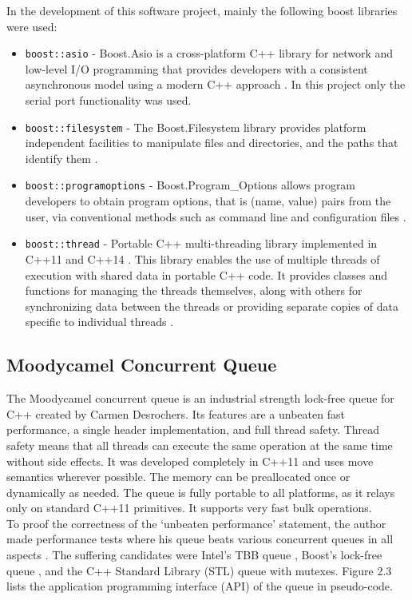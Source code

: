 In the development of this software project, mainly the following boost libraries were used:
\begin{itemize}
\item \texttt{boost::asio} - Boost.Asio is a cross-platform C++ library for network and low-level I/O programming that provides developers with a consistent asynchronous model using a modern C++ approach \cite{boost_asio}. In this project only the serial port functionality was used.
\item \texttt{boost::filesystem} - The Boost.Filesystem library provides platform independent facilities to manipulate files and directories, and the paths that identify them \cite{boost_files}.
\item \texttt{boost::programoptions} - Boost.Program\_Options allows program developers to obtain program options, that is (name, value) pairs from the user, via conventional methods such as command line and configuration files \cite{boost_po}. 
\item \texttt{boost::thread} - Portable C++ multi-threading library implemented in C++11 \cite{cpp_11} and C++14 \cite{cpp_14}. This library enables the use of multiple threads of execution with shared data in portable C++ code. It provides classes and functions for managing the threads themselves, along with others for synchronizing data between the threads or providing separate copies of data specific to individual threads \cite{boost_thread}. 
\end{itemize}
\subsection{Moodycamel Concurrent Queue}
The Moodycamel concurrent queue is an industrial strength lock-free queue for C++ created by Carmen Desrochers. Its features are a unbeaten fast performance, a single header implementation, and full thread safety. Thread safety means that all threads can execute the same operation at the same time without side effects. It was developed completely in C++11 and uses move semantics wherever possible. The memory can be preallocated once or dynamically as needed. The queue is fully portable to all platforms, as it relays only on standard C++11 primitives. It supports very fast bulk operations. \cite{moody}\\
To proof the correctness of the `unbeaten performance' statement, the author made performance tests where his queue beats various concurrent queues in all aspects \cite{benchmark}. The suffering candidates were Intel's TBB queue \cite{intel_tbb}, Boost's lock-free queue \cite{boost_lockfree}, and the C++ Standard Library (STL) queue \cite{std_queue} with mutexes. Figure 2.3 lists the application programming interface (API) of the queue in pseudo-code.

